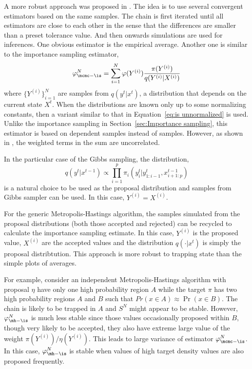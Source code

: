 

A more robust approach was proposed in \cite{Robert:1995ge}. The idea is to
use several convergent estimators based on the same samples. The chain is
first iterated until all estimators are close to each other in the sense that
the differences are smaller than a preset tolerance value. And then onwards
simulations are used for inferences. One obvious estimator is the empirical
average. Another one is similar to the importance sampling estimator,
\begin{equation}
  \varphi_{\mcmc-\is}^N
  = \sum_{i=1}^N \varphi(Y^{(i)})\frac{\pi(Y^{(i)})}{q(Y^{(i)}|X^{(i)})}
  \label{eq:sn is}
\end{equation}
where $\{Y^{(i)}\}_{i=1}^N$ are samples from $q(y^t|x^t)$, a distribution
that depends on the current state $X^t$. When the distributions are known
only up to some normalizing constants, then a variant similar to that in
Equation~\eqref{eq:is unnormalized} is used. Unlike the importance sampling
in Section~\ref{sec:Importance sampling}, this estimator is based on
dependent samples instead of \iid samples. However, as shown in
\cite[][Lemma~12.11]{Robert:2004tn}, the weighted terms in the sum are
uncorrelated.

In the particular case of the Gibbs sampling, the distribution,
\begin{equation}
  q(y^t|x^{t-1}) \propto
  \prod_{i=1}^p \pi_i(y_i^t|y_{1:i-1}^t,x_{i+1:p}^{t-1})
\end{equation}
is a natural choice to be used as the proposal distribution and samples from
Gibbs sampler can be used. In this case, $Y^{(i)} = X^{(i)}$.

For the generic Metropolis-Hastings algorithm, the samples simulated from the
proposal distributions (both those accepted and rejected) can be recycled to
calculate the importance sampling estimate. In this case, $Y^{(i)}$ is the
proposed value, $X^{(i)}$ are the accepted values and the distribution
$q(\cdot|x^t)$ is simply the proposal distribtution. This approach is more
robust to trapping state than the simple plots of averages.

For example, consider an independent Metropolis-Hastings algorithm with
proposal $\eta$ have only one high probability region $A$ while the target
$\pi$ has two high probability regions $A$ and $B$ such that $Pr(x\in
A)\approx\Pr(x\in B)$. The chain is likely to be trapped in $A$ and $S^N$
might appear to be stable. However, $\varphi_{\mh-\is}^N$ is much less stable
since those values occasionally proposed within $B$, though very likely to be
accepted, they also have extreme large value of the weight
$\pi(Y^{(i)})/\eta(Y^{(i)})$. This leads to large variance of estimator
$\varphi_{\mcmc-\is}^N$. In this case, $\varphi_{\mh-\is}^N$ is stable when
values of high target density values are also proposed frequently.

